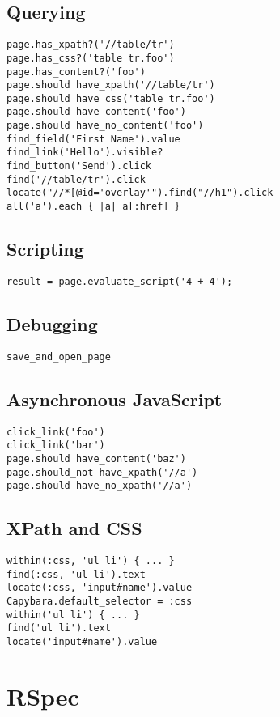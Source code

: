 \documentclass[a4paper, captions=tableheading]{tufte-handout}
\begin{document}
\subsection{Querying}
\label{sec:orgheadline6}
\begin{verbatim}
page.has_xpath?('//table/tr')
page.has_css?('table tr.foo')
page.has_content?('foo')
page.should have_xpath('//table/tr')
page.should have_css('table tr.foo')
page.should have_content('foo')
page.should have_no_content('foo')
find_field('First Name').value
find_link('Hello').visible?
find_button('Send').click
find('//table/tr').click
locate("//*[@id='overlay'").find("//h1").click
all('a').each { |a| a[:href] }
\end{verbatim}

\subsection{Scripting}
\label{sec:orgheadline7}
\begin{verbatim}
result = page.evaluate_script('4 + 4');
\end{verbatim}

\subsection{Debugging}
\label{sec:orgheadline8}
\begin{verbatim}
save_and_open_page
\end{verbatim}

\subsection{Asynchronous JavaScript}
\label{sec:orgheadline9}
\begin{verbatim}
click_link('foo')
click_link('bar')
page.should have_content('baz')
page.should_not have_xpath('//a')
page.should have_no_xpath('//a')
\end{verbatim}

\subsection{XPath and CSS}
\label{sec:orgheadline10}
\begin{verbatim}
within(:css, 'ul li') { ... }
find(:css, 'ul li').text
locate(:css, 'input#name').value
Capybara.default_selector = :css
within('ul li') { ... }
find('ul li').text
locate('input#name').value
\end{verbatim}

\section{RSpec}
\label{sec:orgheadline12}
\end{document}
